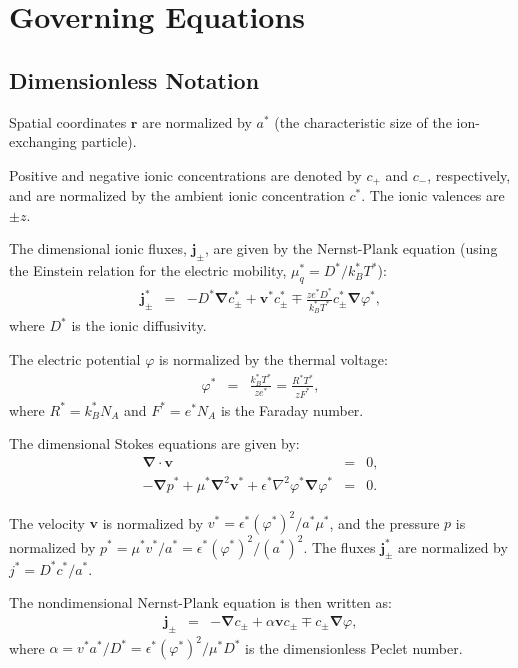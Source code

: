 \documentclass[final]{elsarticle}
\newcommand\eps \epsilon
\newcommand\Laplacian{\nabla^2}
\newcommand\bnabla{\boldsymbol{\nabla}}
\newcommand\bLaplacian{\boldsymbol{\nabla}^2}
\newcommand\bv{\boldsymbol{v}}
\newcommand\bj{\boldsymbol{j}}
\newcommand\br{\boldsymbol{r}}
\begin{document}
\section{Governing Equations} \label{sec:equations}

\subsection{Dimensionless Notation}

Spatial coordinates $\br$ are normalized by $a^*$ 
(the characteristic size of the ion-exchanging particle).

Positive and negative ionic concentrations are denoted by $c_+$ and $c_-$, respectively, and
are normalized by the ambient ionic concentration $c^*$. The ionic valences are $\pm z$.

The dimensional ionic fluxes, $\bj_\pm$, are given by the Nernst-Plank equation 
(using the Einstein relation for the electric mobility, $\mu_q^* = D^* / k_B^* T^*$):
\begin{eqnarray*}
\bj^*_\pm &=& 
-D^* \bnabla c^*_\pm + \bv^* c^*_\pm \mp \frac{z e^* D^*}{k_B^* T^*} c^*_\pm \bnabla \varphi^*,
\end{eqnarray*}
where $D^*$ is the ionic diffusivity.

The electric potential $\varphi$ is normalized by the thermal voltage:
\begin{eqnarray*}
\varphi^* &=& \frac{k_B^* T^*}{z e^*} = \frac{R^* T^*}{z F^*},
\end{eqnarray*}
where $R^* = k_B^* N_A$ and $F^* = e^* N_A$ is the Faraday number.

The dimensional Stokes equations are given by:
\begin{eqnarray*}
\bnabla \cdot \bv &=& 0, \\
-\bnabla p^* + \mu^* \bLaplacian \bv^* + \eps^* \Laplacian \varphi^* \bnabla \varphi^* &=& 0.
\end{eqnarray*}

The velocity $\bv$ is normalized by $v^* = {\eps^* (\varphi^*)^2}/{a^* \mu^*}$,
and the pressure $p$ is normalized by $p^* = {\mu^* v^*}/{a^*} = {\eps^* (\varphi^*)^2}/{(a^*)^2}$.
The fluxes $\bj^*_\pm$ are normalized by $j^* = {D^* c^*}/{a^*}$.

The nondimensional Nernst-Plank equation is then written as:
\begin{eqnarray*}
\bj_\pm &=& 
-\bnabla c_\pm + \alpha \bv c_\pm \mp c_\pm \bnabla \varphi,
\end{eqnarray*}
where $\alpha = {v^* a^*}/{D^*} = {\eps^* (\varphi^*)^2}/{\mu^* D^*}$ 
is the dimensionless Peclet number.
\end{document}
